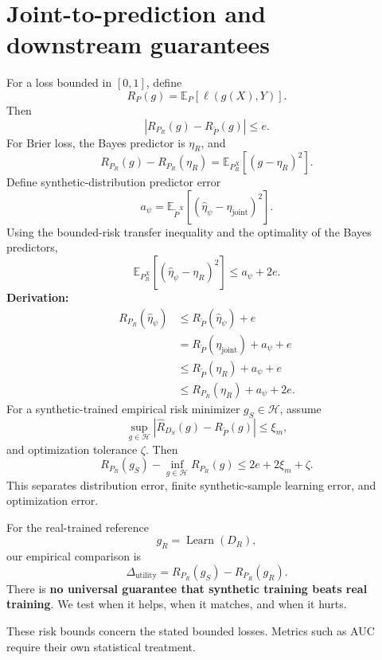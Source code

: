 \documentclass[11pt,a4paper]{article}
\begin{document}
\section{Joint-to-prediction and downstream guarantees}
For a loss bounded in $[0,1]$, define
\[
R_P(g)=\mathbb E_P[\ell(g(X),Y)].
\]
Then
\[
\boxed{|R_{P_R}(g)-R_{\widetilde P}(g)|\leq e.}
\]
For Brier loss, the Bayes predictor is $\eta_R$, and
\[
\boxed{R_{P_R}(g)-R_{P_R}(\eta_R)
=\mathbb E_{P_R^X}[(g-\eta_R)^2].}
\]
Define synthetic-distribution predictor error
\[
a_\psi=\mathbb E_{\widetilde P^X}
\left[(\widehat\eta_\psi-\eta_{\mathrm{joint}})^2\right].
\]
Using the bounded-risk transfer inequality and the optimality of the Bayes predictors,
\[
\boxed{\mathbb E_{P_R^X}\left[(\widehat\eta_\psi-\eta_R)^2\right]
\leq a_\psi+2e.}
\]
\textbf{Derivation:}
\[
\begin{aligned}
R_{P_R}(\widehat\eta_\psi)
&\leq R_{\widetilde P}(\widehat\eta_\psi)+e\\
&=R_{\widetilde P}(\eta_{\mathrm{joint}})+a_\psi+e\\
&\leq R_{\widetilde P}(\eta_R)+a_\psi+e\\
&\leq R_{P_R}(\eta_R)+a_\psi+2e.
\end{aligned}
\]
For a synthetic-trained empirical risk minimizer $g_S\in\mathcal H$, assume
\[
\sup_{g\in\mathcal H}
|\widehat R_{D_S}(g)-R_{\widetilde P}(g)|\leq\xi_m,
\]
and optimization tolerance $\zeta$. Then
\[
\boxed{R_{P_R}(g_S)-\inf_{g\in\mathcal H}R_{P_R}(g)
\leq2e+2\xi_m+\zeta.}
\]
This separates distribution error, finite synthetic-sample learning error, and optimization error.

For the real-trained reference
\[
g_R=\operatorname{Learn}(D_R),
\]
our empirical comparison is
\[
\Delta_{\mathrm{utility}}=R_{P_R}(g_S)-R_{P_R}(g_R).
\]
There is \textbf{no universal guarantee that synthetic training beats real training}. We test when it helps, when it matches, and when it hurts.

These risk bounds concern the stated bounded losses. Metrics such as AUC require their own statistical treatment.
\end{document}
